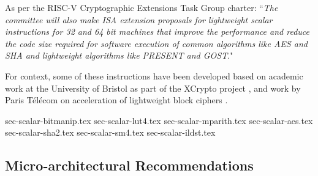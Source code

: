 
As per the RISC-V Cryptographic Extensions Task Group charter:
``{\em The committee will also make ISA extension proposals for lightweight
scalar instructions for 32 and 64 bit machines that improve the performance
and reduce the code size required for software execution of common algorithms
like AES and SHA and lightweight algorithms like PRESENT and GOST}."

\bigskip

For context, some of these instructions have been developed based on academic
work at the University of Bristol as part of the XCrypto project
\cite{MPP:19},
and work by
Paris T\'{e}l\'{e}com on acceleration of lightweight block ciphers
\cite{TGMGD:19}.



{sec-scalar-bitmanip.tex}
{sec-scalar-lut4.tex}
{sec-scalar-mparith.tex}
{sec-scalar-aes.tex}
{sec-scalar-sha2.tex}
{sec-scalar-sm4.tex}
{sec-scalar-ildst.tex}


\newpage
\subsection{Micro-architectural Recommendations}




